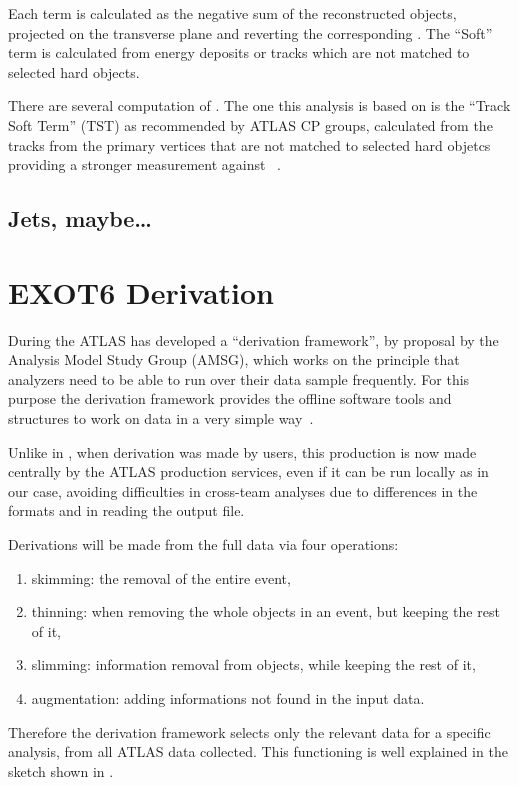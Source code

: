 Each term is calculated as the negative sum of the reconstructed objects, projected on the transverse plane and reverting the corresponding \pt. The ``Soft'' term is calculated from energy deposits or tracks which are not matched to selected hard objects. 

There are several computation of \met. The one this analysis is based on is the ``Track Soft Term'' (TST) as recommended by ATLAS CP groups, calculated from the tracks from the primary vertices that are not matched to selected hard objetcs providing a stronger measurement against \pileup~\cite{Brunt:2013489}.

\subsection{Jets, maybe\dots}

\section{EXOT6 Derivation}
\label{sec:derivation}
During the \RunTwo ATLAS has developed a ``derivation framework'', by proposal by the Analysis Model Study Group (AMSG), which works on the principle that analyzers need to be able to run over their data sample frequently. For this purpose the derivation framework provides the offline software tools and structures to work on data in a very simple way~\cite{twiki:DAOD}. 

Unlike in \RunOne, when derivation was made by users, this production is now made centrally by the ATLAS production services, even if it can be run locally as in our case, avoiding difficulties in cross-team analyses due to differences in the formats and in reading the output file.

Derivations will be made from the full data via four operations:
\begin{enumerate}
\item skimming: the removal of the entire event,
\item thinning: when removing the whole objects in an event, but keeping the rest of it,
\item slimming: information removal from objects, while keeping the rest of it,
\item augmentation: adding informations not found in the input data.
\end{enumerate}

Therefore the derivation framework selects only the relevant data for a specific analysis, from all ATLAS data collected. This functioning is well explained in the sketch shown in \Fig{\ref{fig:derivation}}.

